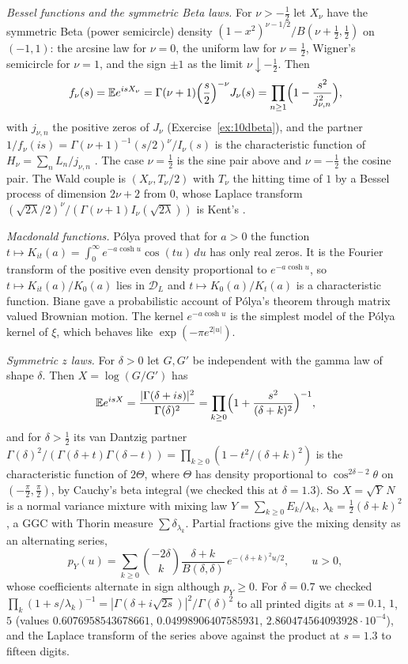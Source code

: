 \emph{Bessel functions and the symmetric Beta laws.} For $\nu>-\frac12$ let $X_\nu$ have the symmetric Beta (power semicircle) density $(1-x^2)^{\nu-1/2}/B(\nu+\frac12,\frac12)$ on $(-1,1)$: the arcsine law for $\nu=0$, the uniform law for $\nu=\frac12$, Wigner's semicircle for $\nu=1$, and the sign $\pm1$ as the limit $\nu\downarrow-\frac12$. Then
\begin{equation}\label{eq:10dbeta}
f_\nu(s) = \mathbb{E} e^{isX_\nu} = \Gamma(\nu+1)\Bigl(\frac s2\Bigr)^{-\nu}J_\nu(s) = \prod_{n\ge1}\Bigl(1-\frac{s^2}{j_{\nu,n}^2}\Bigr),
\end{equation}
with $j_{\nu,n}$ the positive zeros of $J_\nu$ (Exercise~\ref{ex:10dbeta}), and the partner $1/f_\nu(is) = \Gamma(\nu+1)^{-1}(s/2)^\nu/I_\nu(s)$ is the characteristic function of $H_\nu = \sum_nL_n/j_{\nu,n}$ \cite{hinds1974,jurek2010,amdeberhan2012,hasebesimonwang2018}. The case $\nu=\frac12$ is the sine pair above and $\nu=-\frac12$ the cosine pair. The Wald couple is $(X_\nu,T_\nu/2)$ with $T_\nu$ the hitting time of $1$ by a Bessel process of dimension $2\nu+2$ from $0$, whose Laplace transform $(\sqrt{2\lambda}/2)^\nu/(\Gamma(\nu+1)I_\nu(\sqrt{2\lambda}))$ is Kent's \cite{kent1978}.

\emph{Macdonald functions.} P\'olya \cite{polya1926} proved that for $a>0$ the function $t\mapsto K_{it}(a) = \int_0^\infty e^{-a\cosh u}\cos(tu)\,du$ has only real zeros. It is the Fourier transform of the positive even density proportional to $e^{-a\cosh u}$, so $t\mapsto K_{it}(a)/K_0(a)$ lies in $\mathcal D_L$ and $t\mapsto K_0(a)/K_t(a)$ is a characteristic function. Biane \cite{biane2009} gave a probabilistic account of P\'olya's theorem through matrix valued Brownian motion. The kernel $e^{-a\cosh u}$ is the simplest model of the P\'olya kernel of $\xi$, which behaves like $\exp(-\pi e^{2|u|})$.

\emph{Symmetric $z$ laws.} For $\delta>0$ let $G,G'$ be independent with the gamma law of shape $\delta$. Then $X = \log(G/G')$ has
\[
\mathbb{E} e^{isX} = \frac{|\Gamma(\delta+is)|^2}{\Gamma(\delta)^2} = \prod_{k\ge0}\Bigl(1+\frac{s^2}{(\delta+k)^2}\Bigr)^{-1},
\]
and for $\delta>\frac12$ its van Dantzig partner $\Gamma(\delta)^2/(\Gamma(\delta+t)\Gamma(\delta-t)) = \prod_{k\ge0}(1-t^2/(\delta+k)^2)$ is the characteristic function of $2\Theta$, where $\Theta$ has density proportional to $\cos^{2\delta-2}\theta$ on $(-\frac\pi2,\frac\pi2)$, by Cauchy's beta integral (we checked this at $\delta = 1.3$). So $X = \sqrt Y\,N$ is a normal variance mixture with mixing law $Y = \sum_{k\ge0}E_k/\lambda_k$, $\lambda_k = \frac12(\delta+k)^2$, a GGC with Thorin measure $\sum\delta_{\lambda_k}$. Partial fractions give the mixing density as an alternating series,
\[
p_Y(u) = \sum_{k\ge0}\binom{-2\delta}{k}\frac{\delta+k}{B(\delta,\delta)}\,e^{-(\delta+k)^2u/2},\qquad u>0,
\]
whose coefficients alternate in sign although $p_Y\ge0$. For $\delta=0.7$ we checked $\prod_k(1+s/\lambda_k)^{-1} = |\Gamma(\delta+i\sqrt{2s})|^2/\Gamma(\delta)^2$ to all printed digits at $s = 0.1$, $1$, $5$ (values $0.6076958543678661$, $0.04998906407585931$, $2.860474564093928\cdot10^{-4}$), and the Laplace transform of the series above against the product at $s=1.3$ to fifteen digits.

